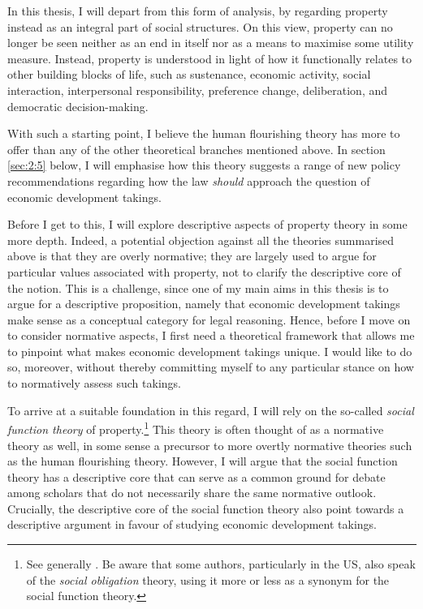 In this thesis, I will depart from this form of analysis, by regarding property instead as an integral part of social structures. On this view, property can no longer be seen neither as an end in itself nor as a means to maximise some utility measure. Instead, property is understood in light of how it functionally relates to other building blocks of life, such as sustenance, economic activity, social interaction, interpersonal responsibility, preference change, deliberation, and democratic decision-making.

With such a starting point, I believe the human flourishing theory has more to offer than any of the other theoretical branches mentioned above. In section \ref{sec:2:5} below, I will emphasise how this theory suggests a range of new policy recommendations regarding how the law {\it should} approach the question of economic development takings.

Before I get to this, I will explore descriptive aspects of property theory in some more depth. Indeed, a potential objection against all the theories summarised above is that they are overly normative; they are largely used to argue for particular values associated with property, not to clarify the descriptive core of the notion. This is a challenge, since one of my main aims in this thesis is to argue for a descriptive proposition, namely that economic development takings make sense as a conceptual category for legal reasoning. Hence, before I move on to consider normative aspects, I first need a theoretical framework that allows me to pinpoint what makes economic development takings unique. I would like to do so, moreover, without thereby committing myself to any particular stance on how to normatively assess such takings.

To arrive at a suitable foundation in this regard, I will rely on the so-called {\it social function theory} of property.\footnote{See generally \cite{foster11,mirow10,alexander09a}. Be aware that some authors, particularly in the US, also speak of the {\it social obligation} theory, using it more or less as a synonym for the social function theory.} This theory is often thought of as a normative theory as well, in some sense a precursor to more overtly normative theories such as the human flourishing theory. However, I will argue that the social function theory has a descriptive core that can serve as a common ground for debate among scholars that do not necessarily share the same normative outlook. Crucially, the descriptive core of the social function theory also point towards a descriptive argument in favour of studying economic development takings.

